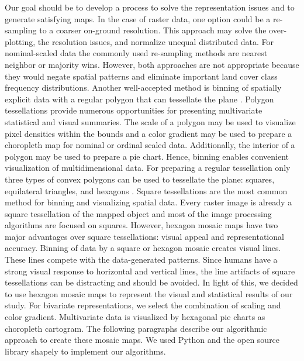 		Our goal should be to develop a process to solve the representation issues and to generate satisfying maps. In the case of raster data, one option could be a re-sampling to a coarser on-ground resolution. This approach may solve the over-plotting, the resolution issues, and normalize unequal distributed data. For nominal-scaled data the commonly used re-sampling methods are nearest neighbor or majority wins. However, both approaches are not appropriate because they would negate spatial patterns and eliminate important land cover class frequency distributions. Another well-accepted method is binning of spatially explicit data with a regular polygon that can tessellate the plane \citep{Carr1992}. Polygon tessellations provide numerous opportunities for presenting multivariate statistical and visual summaries. The scale of a polygon may be used to visualize pixel densities within the bounds and a color gradient may be used to prepare a choropleth map for nominal or ordinal scaled data. Additionally, the interior of a polygon may be used to prepare a pie chart. Hence, binning enables convenient visualization of multidimensional data. For preparing a regular tessellation only three types of convex polygons can be used to tessellate the plane: squares, equilateral triangles, and hexagons \citep{Carr1992}. Square tessellations are the most common method for binning and visualizing spatial data. Every raster image is already a square tessellation of the mapped object and most of the image processing algorithms are focused on squares. However, hexagon mosaic maps have two major advantages over square tessellations: visual appeal and representational accuracy. Binning of data by a square or hexagon mosaic creates visual lines. These lines compete with the data-generated patterns. Since humans have a strong visual response to horizontal and vertical lines, the line artifacts of square tessellations can be distracting and should be avoided. In light of this, we decided to use hexagon mosaic maps to represent the visual and statistical results of our study. For bivariate representations, we select the combination of scaling and color gradient. Multivariate data is visualized by hexagonal pie charts as choropleth cartogram. The following paragraphs describe our algorithmic approach to create these mosaic maps. We used Python and the open source library shapely to implement our algorithms.

